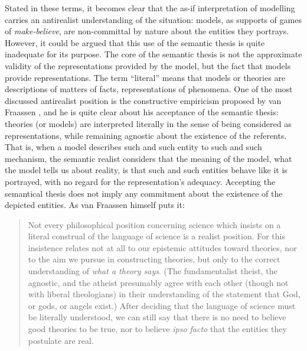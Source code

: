 \documentclass[a4paper,11pt]{article}
\theoremstyle{definition}
\begin{document}
Stated in these terms, it becomes clear that the as-if interpretation of modelling carries an antirealist understanding of the situation: models, as supports of games of \textit{make-believe}, are non-committal by nature about the entities they portrays. However, it could be argued that this use of the semantic thesis is quite inadequate for its purpose. The core of the semantic thesis is not the approximate validity of the representations provided by the model, but the fact that models provide representations. The term ``literal'' means that models or theories are descriptions of matters of facts, representations of phenomena. One of the most discussed antirealist position is the constructive empiricism proposed by van Fraassen \citep{vanFraassen1980}, and he is quite clear about his acceptance of the semantic thesis: theories (or models) are interpreted literally in the sense of being considered as representations, while remaining agnostic about the existence of the referents. That is, when a model describes such and such entity to such and such mechanism, the semantic realist considers that the meaning of the model, what the model tells us about reality, is that such and such entities behave like it is portrayed, with no regard for the representation's adequacy. Accepting the semantical thesis does not imply any commitment about the existence of the depicted entities. As van Fraassen himself puts it:

\begin{quote}
    Not every philosophical position concerning science which insists on a literal construal of the language of science is a realist position. For this insistence relates not at all to our epistemic attitudes toward theories, nor to the aim we pursue in constructing theories, but only to the correct understanding of \textit{what a theory says}. (The fundamentalist theist, the agnostic, and the atheist presumably agree with each other (though not with liberal theologians) in their understanding of the statement that God, or gods, or angels exist.) After deciding that the language of science must be literally understood, we can still say that there is no need to believe good theories to be true, nor to believe \textit{ipso facto} that the entities they postulate are real. \citep[pp.~11-12]{vanFraassen1980}
\end{quote}
\end{document}

